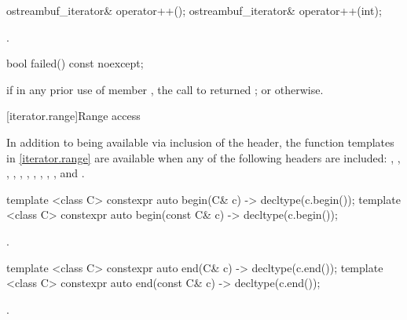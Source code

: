 %
\begin{itemdecl}
ostreambuf_iterator& operator++();
ostreambuf_iterator& operator++(int);
\end{itemdecl}

\begin{itemdescr}
\pnum
\returns
{}.
\end{itemdescr}

%
\begin{itemdecl}
bool failed() const noexcept;
\end{itemdecl}

\begin{itemdescr}
\pnum
\returns
{}
if in any prior use of member
,
the call to
returned
;
or
otherwise.
\end{itemdescr}

[iterator.range]{Range access}

\pnum
In addition to being available via inclusion of the  header,
the function templates in \ref{iterator.range} are available when any of the following
headers are included: , , ,
, , , , ,
, , and .

%
\begin{itemdecl}
template <class C> constexpr auto begin(C& c) -> decltype(c.begin());
template <class C> constexpr auto begin(const C& c) -> decltype(c.begin());
\end{itemdecl}

\begin{itemdescr}
\pnum
\returns {}.
\end{itemdescr}

%
\begin{itemdecl}
template <class C> constexpr auto end(C& c) -> decltype(c.end());
template <class C> constexpr auto end(const C& c) -> decltype(c.end());
\end{itemdecl}

\begin{itemdescr}
\pnum
\returns {}.
\end{itemdescr}

